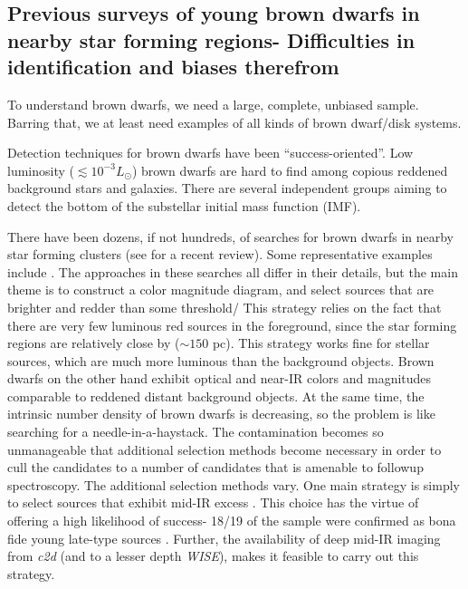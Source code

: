 \subsection{Previous surveys of young brown dwarfs in nearby star forming regions- Difficulties in identification and biases therefrom}

To understand brown dwarfs, we need a large, complete, unbiased sample.  Barring that, we at least need examples of all kinds of brown dwarf/disk systems.

Detection techniques for brown dwarfs have been ``success-oriented''.  Low luminosity ($\lesssim10^{-3}L_{\odot}$) brown dwarfs are hard to find among copious reddened background stars and galaxies.  There are several independent groups aiming to detect the bottom of the substellar initial mass function (IMF).

There have been dozens, if not hundreds, of searches for brown dwarfs in nearby star forming clusters (see \citet{2012ARA&A..50...65L} for a recent review).  Some representative examples include \cite{2004ApJ...602..816L,2012A&A...539A.151A, 2014ApJ...785..159M}.  The approaches in these searches all differ in their details, but the main theme is to construct a color magnitude diagram, and select sources that are brighter and redder than some threshold/  This strategy relies on the fact that there are very few luminous red sources in the foreground, since the star forming regions are relatively close by ($\sim150$ pc).  This strategy works fine for stellar sources, which are much more luminous than the background objects.  Brown dwarfs on the other hand exhibit optical and near-IR colors and magnitudes comparable to reddened distant background objects.  At the same time, the intrinsic number density of brown dwarfs is decreasing, so the problem is like searching for a needle-in-a-haystack.  The contamination becomes so unmanageable that additional selection methods become necessary in order to cull the candidates to a number of candidates that is amenable to followup spectroscopy.  The additional selection methods vary.  One main strategy is simply to select sources that exhibit mid-IR excess \citep{allers06}.  This choice has the virtue of offering a high likelihood of success- 18/19 of the \citet{allers06} sample were confirmed as bona fide young late-type sources \citep{2011ASPC..448..633G}.  Further, the availability of deep mid-IR imaging from \emph{c2d} (and to a lesser depth \emph{WISE}), makes it feasible to carry out this strategy.  

